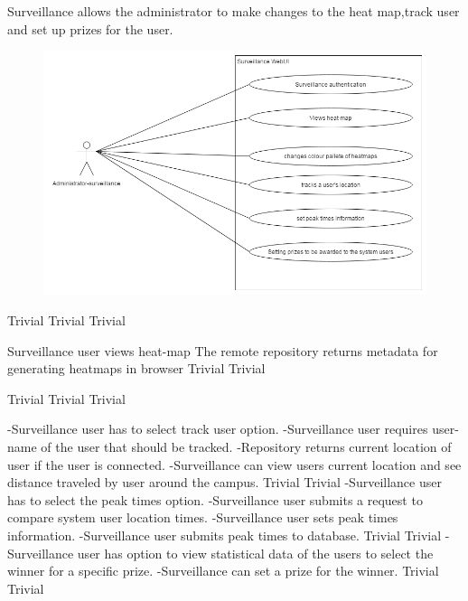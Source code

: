 Surveillance allows the administrator to make changes to the heat map,track user and set up prizes for the user.
\begin{figure} 
  \includegraphics[width=\textwidth]{diagrams/Specific_Requirements/surveillance_webUI.png}
\end{figure}

 		{Trivial}
    {Trivial}
    {Trivial}

\FuncReq
    {Surveillance user views heat-map}
		{The remote repository returns metadata for generating heatmaps in browser}
    {Trivial}
    {Trivial}

		{Trivial}
    {Trivial}
    {Trivial}
	
		{-Surveillance user has to select track user option.
		-Surveillance user requires user-name of the user that should be tracked.
		-Repository returns current location of user if the user is connected.
		-Surveillance can view users current location and see distance traveled by user around the campus.}
    {Trivial}
    {Trivial}
		{-Surveillance user has to select the peak times option.
		-Surveillance user submits a request to compare system user location times.
		-Surveillance user sets peak times information.
		-Surveillance user submits peak times to database.}
    {Trivial}
    {Trivial}
		{-Surveillance user has option to view statistical data of the users to select the winner for a specific prize.
		 -Surveillance can set a prize for the winner.}
    {Trivial}
    {Trivial}
